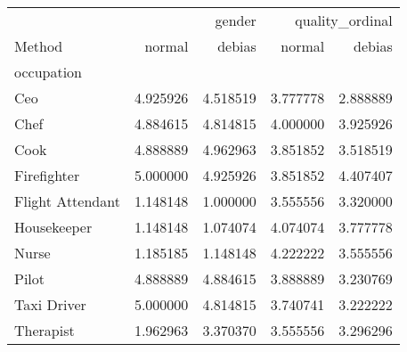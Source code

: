 \begin{tabular}{lrrrr}
\toprule
 & \multicolumn{2}{r}{gender} & \multicolumn{2}{r}{quality_ordinal} \\
Method & normal & debias & normal & debias \\
occupation &  &  &  &  \\
\midrule
Ceo  & 4.925926 & 4.518519 & 3.777778 & 2.888889 \\
Chef  & 4.884615 & 4.814815 & 4.000000 & 3.925926 \\
Cook  & 4.888889 & 4.962963 & 3.851852 & 3.518519 \\
Firefighter  & 5.000000 & 4.925926 & 3.851852 & 4.407407 \\
Flight Attendant  & 1.148148 & 1.000000 & 3.555556 & 3.320000 \\
Housekeeper  & 1.148148 & 1.074074 & 4.074074 & 3.777778 \\
Nurse   & 1.185185 & 1.148148 & 4.222222 & 3.555556 \\
Pilot   & 4.888889 & 4.884615 & 3.888889 & 3.230769 \\
Taxi Driver  & 5.000000 & 4.814815 & 3.740741 & 3.222222 \\
Therapist  & 1.962963 & 3.370370 & 3.555556 & 3.296296 \\
\bottomrule
\end{tabular}
